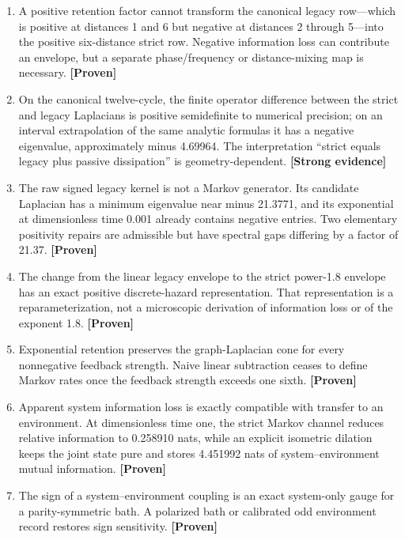 \documentclass[11pt,a4paper,openany]{report}
\newcommand{\statusProven}{\textcolor{fingreen}{[Proven]}}
\newcommand{\statusStrong}{\textcolor{finblue}{[Strong evidence]}}
\begin{document}
\begin{enumerate}
\item 
A positive retention factor cannot transform the canonical legacy row—which is positive at distances 1 and 6 but negative at distances 2 through 5—into the positive six-distance strict row. Negative information loss can contribute an envelope, but a separate phase/\allowbreak{}frequency or distance-mixing map is necessary. \textbf{\statusProven{}}

\item 
On the canonical twelve-cycle, the finite operator difference between the strict and legacy Laplacians is positive semidefinite to numerical precision; on an interval extrapolation of the same analytic formulas it has a negative eigenvalue, approximately minus 4.69964. The interpretation “strict equals legacy plus passive dissipation” is geometry-dependent. \textbf{\statusStrong{}}

\item 
The raw signed legacy kernel is not a Markov generator. Its candidate Laplacian has a minimum eigenvalue near minus 21.3771, and its exponential at dimensionless time 0.001 already contains negative entries. Two elementary positivity repairs are admissible but have spectral gaps differing by a factor of 21.37. \textbf{\statusProven{}}

\item 
The change from the linear legacy envelope to the strict power-1.8 envelope has an exact positive discrete-hazard representation. That representation is a reparameterization, not a microscopic derivation of information loss or of the exponent 1.8. \textbf{\statusProven{}}

\item 
Exponential retention preserves the graph-Laplacian cone for every nonnegative feedback strength. Naive linear subtraction ceases to define Markov rates once the feedback strength exceeds one sixth. \textbf{\statusProven{}}

\item 
Apparent system information loss is exactly compatible with transfer to an environment. At dimensionless time one, the strict Markov channel reduces relative information to 0.258910 nats, while an explicit isometric dilation keeps the joint state pure and stores 4.451992 nats of system–environment mutual information. \textbf{\statusProven{}}

\item 
The sign of a system–environment coupling is an exact system-only gauge for a parity-symmetric bath. A polarized bath or calibrated odd environment record restores sign sensitivity. \textbf{\statusProven{}}


\end{enumerate}
\end{document}
